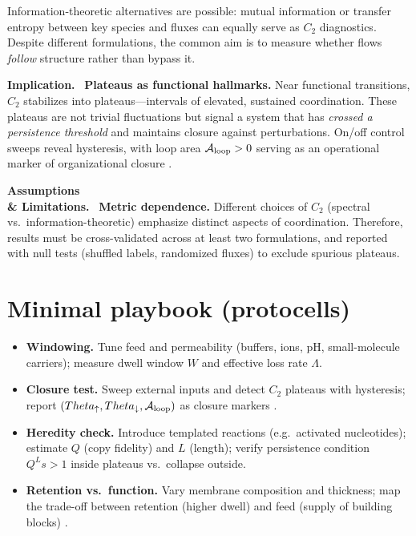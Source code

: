 \documentclass[12pt,a4paper,oneside]{scrreprt}
\def\Theta{Theta}%
\newenvironment{implication}{\par\vspace{0.5em}\noindent\textbf{Implication.}\ }{\par\vspace{0.5em}}
\newenvironment{limitation}{\par\vspace{0.5em}\noindent\textbf{Assumptions \\ \& Limitations.}\ }{\par\vspace{0.5em}}
\begin{document}
Information-theoretic alternatives are possible: mutual information or transfer entropy between key species and fluxes can equally serve as $C_2$ diagnostics. 
Despite different formulations, the common aim is to measure whether flows \emph{follow} structure rather than bypass it.

\begin{implication}
\textbf{Plateaus as functional hallmarks.} 
Near functional transitions, $C_2$ stabilizes into plateaus—intervals of elevated, sustained coordination. 
These plateaus are not trivial fluctuations but signal a system that has \emph{crossed a persistence threshold} and maintains closure against perturbations. 
On/off control sweeps reveal hysteresis, with loop area $\mathcal A_{\rm loop}>0$ serving as an operational marker of organizational closure \cite{MaturanaVarela1980, NicolisPrigogine1977}.
\end{implication}

\begin{limitation}
\textbf{Metric dependence.} 
Different choices of $C_2$ (spectral vs.\ information-theoretic) emphasize distinct aspects of coordination. 
Therefore, results must be cross-validated across at least two formulations, and reported with null tests (shuffled labels, randomized fluxes) to exclude spurious plateaus.
\end{limitation}

\section{Minimal playbook (protocells)}\label{sec:life-playbook}
\begin{itemize}
\item \textbf{Windowing.} Tune feed and permeability (buffers, ions, pH, small-molecule carriers); measure dwell window $W$ and effective loss rate $\Lambda$.
\item \textbf{Closure test.} Sweep external inputs and detect $C_2$ plateaus with hysteresis; report $(\Theta_\uparrow,\Theta_\downarrow,\mathcal A_{\rm loop})$ as closure markers \cite{MaturanaVarela1980}.
\item \textbf{Heredity check.} Introduce templated reactions (e.g.\ activated nucleotides); estimate $Q$ (copy fidelity) and $L$ (length); verify persistence condition $Q^L s>1$ inside plateaus vs.\ collapse outside.
\item \textbf{Retention vs.\ function.} Vary membrane composition and thickness; map the trade-off between retention (higher dwell) and feed (supply of building blocks) \cite{Szostak2012,Chen2017}.
\end{itemize}
\end{document}
